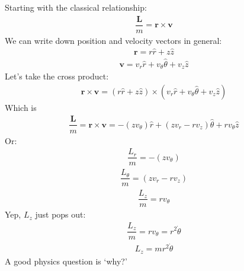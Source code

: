 \documentclass[letterpaper,10pt,english]{jupyterBook}
\begin{document}
\sphinxAtStartPar
Starting with the classical relationship:
\begin{equation*}
\begin{split}\dfrac{\mathbf{L}}{m} = \mathbf{r} \times \mathbf{v}\end{split}
\end{equation*}
\sphinxAtStartPar
We can write down position and velocity vectors in general:
\begin{equation*}
\begin{split}\mathbf{r} = r\hat{r} + z\hat{z}\end{split}
\end{equation*}\begin{equation*}
\begin{split}\mathbf{v} = v_r\hat{r} + v_{\theta}\hat{\theta} + v_z \hat{z}\end{split}
\end{equation*}
\sphinxAtStartPar
Let’s take the cross product:
\begin{equation*}
\begin{split}\mathbf{r} \times \mathbf{v} = \left(r\hat{r} + z\hat{z}\right) \times
\left( v_r\hat{r} + v_{\theta}\hat{\theta} + v_z \hat{z} \right)\end{split}
\end{equation*}
\sphinxAtStartPar
Which is
\begin{equation*}
\begin{split}\dfrac{\mathbf{L}}{m} = \mathbf{r} \times \mathbf{v} = -(z v_{\theta})\hat{r} + (z v_r -r v_z)\hat{\theta} + rv_{\theta}\hat{z}\end{split}
\end{equation*}
\sphinxAtStartPar
Or:
\begin{equation*}
\begin{split}\dfrac{L_r}{m} = -(z v_{\theta})\end{split}
\end{equation*}\begin{equation*}
\begin{split}\dfrac{L_{\theta}}{m} = (z v_r -r v_z)\end{split}
\end{equation*}\begin{equation*}
\begin{split}\dfrac{L_z}{m} = rv_{\theta}\end{split}
\end{equation*}
\sphinxAtStartPar
Yep, \(L_z\) just pops out:
\begin{equation*}
\begin{split}\dfrac{L_z}{m} = rv_{\theta} = r^2\dot{\theta}\end{split}
\end{equation*}\begin{equation*}
\begin{split}L_z = m r^2\dot{\theta}\end{split}
\end{equation*}
\sphinxAtStartPar
A good physics question is ‘why?’
\end{document}
